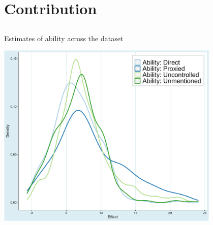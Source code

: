 \documentclass{beamer} %
\begin{document}
\section{Contribution}
\subsection{}

\begin{frame}{Estimates of ability across the dataset}

    \begin{center}
        \includegraphics[width=0.8\textwidth]{Figures/prima_facie_ability.png}
    \end{center}

\end{frame}


\end{document}
